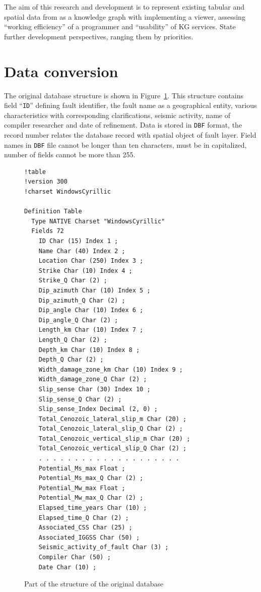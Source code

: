 \documentclass[
]{ceurart}
\begin{document}
The aim of this research and development is to represent existing tabular and spatial data from \cite{lunina,afs} as a knowledge graph with implementing a viewer, assessing ``working efficiency'' of a programmer and ``usability'' of KG services.  State further development perspectives, ranging them by priorities.

\section{Data conversion}

The original database structure is shown in Figure~\ref{fig:db-struct}.  This structure contains  field ``\texttt{ID}'' defining fault identifier, the fault name as a geographical entity, various characteristics with corresponding clarifications, seismic activity, name of compiler researcher and date of refinement.  Data is stored in \texttt{DBF} format, the record number relates the database record with spatial object of fault layer.  Field names in \texttt{DBF} file cannot be longer than ten characters, must be in capitalized, number of fields cannot be more than 255.
\begin{figure}
  \centering
  \footnotesize
    \begin{multicols}{2}
\begin{verbatim}
!table
!version 300
!charset WindowsCyrillic

Definition Table
  Type NATIVE Charset "WindowsCyrillic"
  Fields 72
    ID Char (15) Index 1 ;
    Name Char (40) Index 2 ;
    Location Char (250) Index 3 ;
    Strike Char (10) Index 4 ;
    Strike_Q Char (2) ;
    Dip_azimuth Char (10) Index 5 ;
    Dip_azimuth_Q Char (2) ;
    Dip_angle Char (10) Index 6 ;
    Dip_angle_Q Char (2) ;
    Length_km Char (10) Index 7 ;
    Length_Q Char (2) ;
    Depth_km Char (10) Index 8 ;
    Depth_Q Char (2) ;
    Width_damage_zone_km Char (10) Index 9 ;
    Width_damage_zone_Q Char (2) ;
    Slip_sense Char (30) Index 10 ;
    Slip_sense_Q Char (2) ;
    Slip_sense_Index Decimal (2, 0) ;
    Total_Cenozoic_lateral_slip_m Char (20) ;
    Total_Cenozoic_lateral_slip_Q Char (2) ;
    Total_Cenozoic_vertical_slip_m Char (20) ;
    Total_Cenozoic_vertical_slip_Q Char (2) ;
    . . . . . . . . . . . . . . . . . . . .
    Potential_Ms_max Float ;
    Potential_Ms_max_Q Char (2) ;
    Potential_Mw_max Float ;
    Potential_Mw_max_Q Char (2) ;
    Elapsed_time_years Char (10) ;
    Elapsed_time_Q Char (2) ;
    Associated_CSS Char (25) ;
    Associated_IGGSS Char (50) ;
    Seismic_activity_of_fault Char (3) ;
    Compiler Char (50) ;
    Date Char (10) ;
\end{verbatim}
  \end{multicols}
  \caption{Part of the structure of the original database}
  \label{fig:db-struct}
\end{figure}
\end{document}
